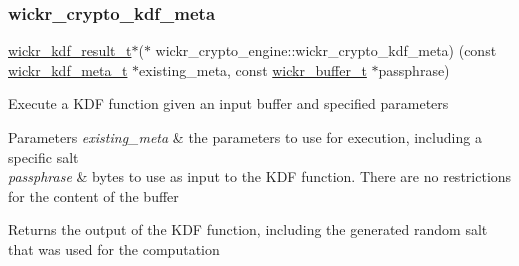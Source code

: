 \subsubsection{\texorpdfstring{wickr\+\_\+crypto\+\_\+kdf\+\_\+meta}{wickr\_crypto\_kdf\_meta}}
{\footnotesize\ttfamily \mbox{\hyperlink{structwickr__kdf__result}{wickr\+\_\+kdf\+\_\+result\+\_\+t}}$\ast$($\ast$ wickr\+\_\+crypto\+\_\+engine\+::wickr\+\_\+crypto\+\_\+kdf\+\_\+meta) (const \mbox{\hyperlink{structwickr__kdf__meta}{wickr\+\_\+kdf\+\_\+meta\+\_\+t}} $\ast$existing\+\_\+meta, const \mbox{\hyperlink{structwickr__buffer}{wickr\+\_\+buffer\+\_\+t}} $\ast$passphrase)}

Execute a K\+DF function given an input buffer and specified parameters


\begin{DoxyParams}{Parameters}
{\em existing\+\_\+meta} & the parameters to use for execution, including a specific salt \\
\hline
{\em passphrase} & bytes to use as input to the K\+DF function. There are no restrictions for the content of the buffer \\
\hline
\end{DoxyParams}
\begin{DoxyReturn}{Returns}
the output of the K\+DF function, including the generated random salt that was used for the computation 
\end{DoxyReturn}

